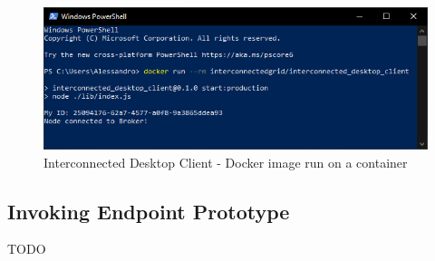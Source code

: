 \begin{figure}[!ht]
    \centering
    \includegraphics[scale=0.8]{document/chapters/chapter_7/images/interconnected_desktop.png}
    \caption{Interconnected Desktop Client - Docker image run on a container}
    \label{fig:interconnected_desktop}
\end{figure}

\subsection{Invoking Endpoint Prototype}
TODO